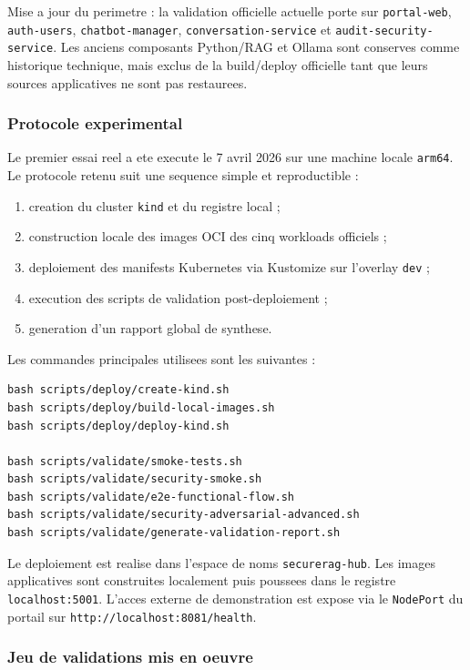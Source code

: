 Mise a jour du perimetre : la validation officielle actuelle porte sur \texttt{portal-web}, \texttt{auth-users}, \texttt{chatbot-manager}, \texttt{conversation-service} et \texttt{audit-security-service}. Les anciens composants Python/RAG et Ollama sont conserves comme historique technique, mais exclus de la build/deploy officielle tant que leurs sources applicatives ne sont pas restaurees.

\subsubsection{Protocole experimental}

Le premier essai reel a ete execute le 7 avril 2026 sur une machine locale \texttt{arm64}. Le protocole retenu suit une sequence simple et reproductible :

\begin{enumerate}
  \item creation du cluster \texttt{kind} et du registre local ;
  \item construction locale des images OCI des cinq workloads officiels ;
  \item deploiement des manifests Kubernetes via Kustomize sur l'overlay \texttt{dev} ;
  \item execution des scripts de validation post-deploiement ;
  \item generation d'un rapport global de synthese.
\end{enumerate}

Les commandes principales utilisees sont les suivantes :

\begin{verbatim}
bash scripts/deploy/create-kind.sh
bash scripts/deploy/build-local-images.sh
bash scripts/deploy/deploy-kind.sh

bash scripts/validate/smoke-tests.sh
bash scripts/validate/security-smoke.sh
bash scripts/validate/e2e-functional-flow.sh
bash scripts/validate/security-adversarial-advanced.sh
bash scripts/validate/generate-validation-report.sh
\end{verbatim}

Le deploiement est realise dans l'espace de noms \texttt{securerag-hub}. Les images applicatives sont construites localement puis poussees dans le registre \texttt{localhost:5001}. L'acces externe de demonstration est expose via le \texttt{NodePort} du portail sur \texttt{http://localhost:8081/health}.

\subsubsection{Jeu de validations mis en oeuvre}

